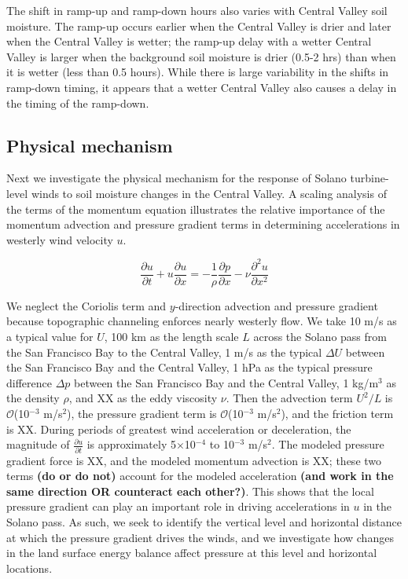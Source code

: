 \documentclass[12pt]{amsart}
\begin{document}
The shift in ramp-up and ramp-down hours also varies with Central Valley soil moisture.  The ramp-up occurs earlier when the Central Valley is drier and later when the Central Valley is wetter; the ramp-up delay with a wetter Central Valley is larger when the background soil moisture is drier (0.5-2 hrs) than when it is wetter (less than 0.5 hours).  While there is large variability in the shifts in ramp-down timing, it appears that a wetter Central Valley also causes a delay in the timing of the ramp-down.

\subsection{Physical mechanism}
Next we investigate the physical mechanism for the response of Solano turbine-level winds to soil moisture changes in the Central Valley.  A scaling analysis of the terms of the momentum equation illustrates the relative importance of the momentum advection and pressure gradient terms in determining accelerations in westerly wind velocity $u$.  

\begin{equation}
\frac{\partial u}{\partial t} + u\frac{\partial u}{\partial x} = -\frac{1}{\rho} \frac{\partial p}{\partial x} - \nu \frac{\partial^2 u}{\partial x^2}
\end{equation}

We neglect the Coriolis term and $y$-direction advection and pressure gradient because topographic channeling enforces nearly westerly flow.  We take 10 m/s as a typical value for $U$, 100 km as the length scale $L$ across the Solano pass from the San Francisco Bay to the Central Valley, 1 m/s as the typical $\Delta U$ between the San Francisco Bay and the Central Valley, 1 hPa as the typical pressure difference $\Delta p$ between the San Francisco Bay and the Central Valley, 1 kg/m$^3$ as the density $\rho$, and XX as the eddy viscosity $\nu$. Then the advection term $U^2/L$ is $\mathcal{O}$(10$^{-3}$ m/s$^2$), the pressure gradient term is $\mathcal{O}$(10$^{-3}$ m/s$^2$), and the friction term is XX.  During periods of greatest wind acceleration or deceleration, the magnitude of $\frac{\partial u}{\partial t}$ is approximately 5$\times$10$^{-4}$ to 10$^{-3}$ m/s$^2$.  The modeled pressure gradient force is XX, and the modeled momentum advection is XX; these two terms \textbf{(do or do not)} account for the modeled acceleration \textbf{(and work in the same direction OR counteract each other?)}.  This shows that the local pressure gradient can play an important role in driving accelerations in $u$ in the Solano pass.  As such, we seek to identify the vertical level and horizontal distance at which the pressure gradient drives the winds, and we investigate how changes in the land surface energy balance affect pressure at this level and horizontal locations.
\end{document}
